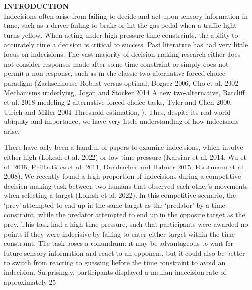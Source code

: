 \documentclass[12pt,letterpaper]{article}
\begin{document}
\noindent\textbf{\large\textcolor{mydarkblue}{INTRODUCTION}}
\vspace{2mm}
\\
Indecisions often arise from failing to decide and act upon sensory information in time, such as a driver failing to brake or hit the gas pedal when a traffic light turns yellow. When acting under high pressure time constraints, the ability to accurately time a decision is critical to success. Past literature has had very little focus on indecisions. The vast majority of decision-making research either does not consider responses made after some time constraint or simply does not permit a non-response, such as in the classic two-alternative forced choice paradigm (Zachsenhouse Robust versus optimal,  Bogacz 2006, Cho et al. 2002 Mechanisms underlying, Jogan and Stocker 2014 A new two-alternative, Ratcliff et al. 2018 modeling 2-alternative forced-choice tasks, Tyler and Chen 2000, Ulrich and Miller 2004 Threshold estimation,   ). Thus, despite its real-world ubiquity and importance, we have very little understanding of how indecisions arise.

There have only been a handful of papers to examine indecisions, which involve either high (Lokesh et al. 2022) or low time pressure (Karsilar et al. 2014, Wu et al. 2016, Phillastides et al. 2011, Dambacher and Hubner 2015, Forstmann et al. 2008). We recently found a high proportion of indecisions during a competitive decision-making task between two humans that observed each other’s movements when selecting a target (Lokesh et al. 2022). In this competitive scenario, the ‘prey’ attempted to end up in the same target as the ‘predator’ by a time constraint, while the predator attempted to end up in the opposite target as the prey. This task had a high time pressure, such that participants were awarded no points if they were indecisive by failing to enter either target within the time constraint. The task poses a conundrum: it may be advantageous to wait for future sensory information and react to an opponent, but it could also be better to switch from reacting to guessing before the time constraint to avoid an indecision. Surprisingly, participants displayed a median indecision rate of approximately 25%
\end{document}
